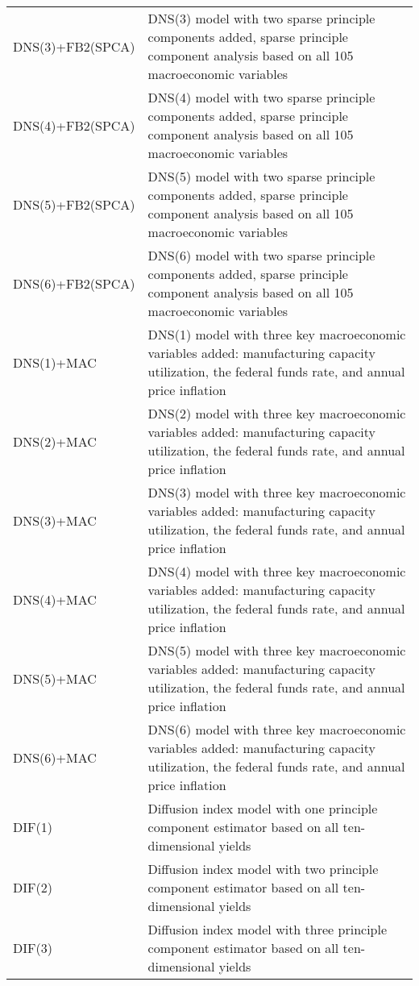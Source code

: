 \begin{footnotesize}
\begin{tabularx}{\linewidth}{lX}
DNS(3)+FB2(SPCA)          & DNS(3) model with two sparse principle components added, sparse principle component analysis based on all 105 macroeconomic variables \\
DNS(4)+FB2(SPCA)          & DNS(4) model with two sparse principle components added, sparse principle component analysis based on all 105 macroeconomic variables \\
DNS(5)+FB2(SPCA)          & DNS(5) model with two sparse principle components added, sparse principle component analysis based on all 105 macroeconomic variables \\
DNS(6)+FB2(SPCA)          & DNS(6) model with two sparse principle components added, sparse principle component analysis based on all 105 macroeconomic variables \\
DNS(1)+MAC                & DNS(1) model with three key macroeconomic variables added: manufacturing capacity utilization, the federal funds rate, and annual price inflation \\
DNS(2)+MAC                & DNS(2) model with three key macroeconomic variables added: manufacturing capacity utilization, the federal funds rate, and annual price inflation \\
DNS(3)+MAC                & DNS(3) model with three key macroeconomic variables added: manufacturing capacity utilization, the federal funds rate, and annual price inflation \\
DNS(4)+MAC                & DNS(4) model with three key macroeconomic variables added: manufacturing capacity utilization, the federal funds rate, and annual price inflation \\
DNS(5)+MAC                & DNS(5) model with three key macroeconomic variables added: manufacturing capacity utilization, the federal funds rate, and annual price inflation \\
DNS(6)+MAC                & DNS(6) model with three key macroeconomic variables added: manufacturing capacity utilization, the federal funds rate, and annual price inflation \\
DIF(1)                    & Diffusion index model with one principle component estimator based on all ten-dimensional yields \\
DIF(2)                    & Diffusion index model with two principle component estimator based on all ten-dimensional yields \\
DIF(3)                    & Diffusion index model with three principle component estimator based on all ten-dimensional yields \\

\end{tabularx}
\end{footnotesize}
